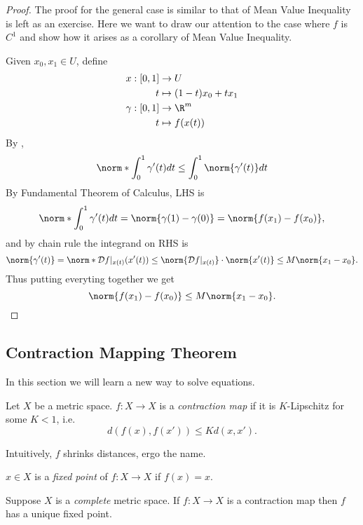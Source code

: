\documentclass[a4paper]{article}
\newcommand*{\D}{\mathcal{D}}
\theoremstyle{definition}
\begin{document}
\begin{proof}
  The proof for the general case is similar to that of Mean Value Inequality is left as an exercise. Here we want to draw our attention to the case where \(f\) is \(C^1\) and show how it arises as a corollary of Mean Value Inequality.

  Given \(x_0, x_1 \in U\), define
  \begin{align*}
    x: [0, 1] &\to U \\
    t &\mapsto (1 - t)x_0 + t x_1 \\
    \gamma: [0, 1] &\to \R^m \\
    t &\mapsto f(x(t))
  \end{align*}
  By ,
  \[
    \norm*{\int_{0}^{1} \gamma'(t) dt} \leq \int_{0}^{1} \norm{\gamma'(t)} dt
  \]
  By Fundamental Theorem of Calculus, LHS is
  \[
    \norm*{\int_{0}^{1} \gamma'(t) dt} = \norm{\gamma(1) - \gamma(0)} = \norm{f(x_1) - f(x_0)},
  \]
  and by chain rule the integrand on RHS is
  \[
    \norm{\gamma'(t)} = \norm*{ \D f|_{x(t)}(x'(t))} \leq \norm{\D f|_{x(t)}} \cdot \norm{x'(t)} \leq M \norm{x_1 - x_0}.
  \]
  Thus putting everyting together we get
  \[
    \norm{f(x_1) - f(x_0)} \leq M \norm{x_1 - x_0}.
  \]
\end{proof}

\subsection{Contraction Mapping Theorem}

In this section we will learn a new way to solve equations.

\begin{definition}
  Let \(X\) be a metric space. \(f: X \to X\) is a \emph{contraction map} if it is \(K\)-Lipschitz for some \(K < 1\), i.e.
  \[
    d(f(x), f(x')) \leq K d(x, x').
  \]
\end{definition}

Intuitively, \(f\) shrinks distances, ergo the name.

\begin{definition}
  \(x \in X\) is a \emph{fixed point} of \(f: X \to X\) if \(f(x) = x\).
\end{definition}

\begin{theorem}
  \label{thm:contraction}
  Suppose \(X\) is a \emph{complete} metric space. If \(f: X \to X\) is a contraction map then \(f\) has a unique fixed point.
\end{theorem}
\end{document}
